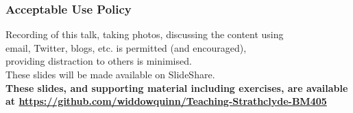
%
\begin{frame}
  \frametitle{Acceptable Use Policy}
  Recording of this talk, taking photos, discussing the content using \\
  email, Twitter, blogs, etc. is permitted (and encouraged), \\
  providing distraction to others is minimised. \\[0.5cm]
  These slides will be made available on SlideShare. \\[0.5cm]
  \textbf{These slides, and supporting material including exercises, are available at \href{https://github.com/widdowquinn/Teaching-Srathclyde-BM405}{https://github.com/widdowquinn/Teaching-Strathclyde-BM405}}
\end{frame}